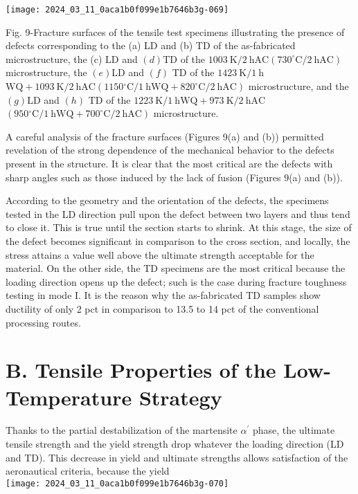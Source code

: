 \documentclass[10pt]{article}
\begin{document}
\begin{center}
\texttt{[image: 2024\_03\_11\_0aca1b0f099e1b7646b3g-069]}
\end{center}

Fig. 9-Fracture surfaces of the tensile test specimens illustrating the presence of defects corresponding to the (a) LD and (b) TD of the as-fabricated microstructure, the (c) LD and $(d) \mathrm{TD}$ of the $1003 \mathrm{~K} / 2 \mathrm{~h} \mathrm{AC}\left(730^{\circ} \mathrm{C} / 2 \mathrm{~h} \mathrm{AC}\right)$ microstructure, the $(e) \mathrm{LD}$ and $(f)$ TD of the $1423 \mathrm{~K} / 1 \mathrm{~h}$ $\mathrm{WQ}+1093 \mathrm{~K} / 2 \mathrm{~h} \mathrm{AC}\left(1150{ }^{\circ} \mathrm{C} / 1 \mathrm{~h} \mathrm{WQ}+820^{\circ} \mathrm{C} / 2 \mathrm{~h} \mathrm{AC}\right)$ microstructure, and the $(g) \mathrm{LD}$ and $(h)$ TD of the $1223 \mathrm{~K} / 1 \mathrm{~h} \mathrm{WQ}+973 \mathrm{~K} / 2 \mathrm{~h} \mathrm{AC}$ $\left(950{ }^{\circ} \mathrm{C} / 1 \mathrm{~h} \mathrm{WQ}+700^{\circ} \mathrm{C} / 2 \mathrm{~h} \mathrm{AC}\right)$ microstructure.

A careful analysis of the fracture surfaces (Figures 9(a) and (b)) permitted revelation of the strong dependence of the mechanical behavior to the defects present in the structure. It is clear that the most critical are the defects with sharp angles such as those induced by the lack of fusion (Figures 9(a) and (b)).

According to the geometry and the orientation of the defects, the specimens tested in the LD direction pull upon the defect between two layers and thus tend to close it. This is true until the section starts to shrink. At this stage, the size of the defect becomes significant in comparison to the cross section, and locally, the stress attains a value well above the ultimate strength acceptable for the material. On the other side, the TD specimens are the most critical because the loading direction opens up the defect; such is the case during fracture toughness testing in mode I. It is the reason why the as-fabricated TD samples show ductility of only 2 pct in comparison to 13.5 to 14 pct of the conventional processing routes.

\section*{B. Tensile Properties of the Low-Temperature Strategy}
Thanks to the partial destabilization of the martensite $\alpha^{\prime}$ phase, the ultimate tensile strength and the yield strength drop whatever the loading direction (LD and TD). This decrease in yield and ultimate strengths allows satisfaction of the aeronautical criteria, because the yield\\
\texttt{[image: 2024\_03\_11\_0aca1b0f099e1b7646b3g-070]}
\end{document}
